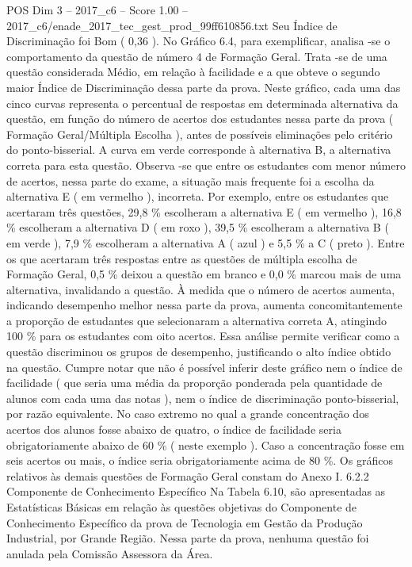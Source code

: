 \begin{textsample}{POS Dim 3 – 2017\_c6 – Score 1.00 – 2017\_c6/enade\_2017\_tec\_gest\_prod\_99ff610856.txt}
Seu Índice de Discriminação foi Bom ( 0,36 ).
No Gráfico 6.4, para exemplificar, analisa -se o comportamento da questão de número 4 de Formação Geral.
Trata -se de uma questão considerada Médio, em relação à facilidade e a que obteve o segundo maior Índice de Discriminação dessa parte da prova.
Neste gráfico, cada uma das cinco curvas representa o percentual de respostas em determinada alternativa da questão, em função do número de acertos dos estudantes nessa parte da prova ( Formação Geral/Múltipla Escolha ), antes de possíveis eliminações pelo critério do ponto-bisserial.
A curva em verde corresponde à alternativa B, a alternativa correta para esta questão.
Observa -se que entre os estudantes com menor número de acertos, nessa parte do exame, a situação mais frequente foi a escolha da alternativa E ( em vermelho ), incorreta.
Por exemplo, entre os estudantes que acertaram três questões, 29,8 \% escolheram a alternativa E ( em vermelho ), 16,8 \% escolheram a alternativa D ( em roxo ), 39,5 \% escolheram a alternativa B ( em verde ), 7,9 \% escolheram a alternativa A ( azul ) e 5,5 \% a C ( preto ).
Entre os que acertaram três respostas entre as questões de múltipla escolha de Formação Geral, 0,5 \% deixou a questão em branco e 0,0 \% marcou mais de uma alternativa, invalidando a questão.
À medida que o número de acertos aumenta, indicando desempenho melhor nessa parte da prova, aumenta concomitantemente a proporção de estudantes que selecionaram a alternativa correta A, atingindo 100 \% para os estudantes com oito acertos.
Essa análise permite verificar como a questão discriminou os grupos de desempenho, justificando o alto índice obtido na questão.
Cumpre notar que não é possível inferir deste gráfico nem o índice de facilidade ( que seria uma média da proporção ponderada pela quantidade de alunos com cada uma das notas ), nem o índice de discriminação ponto-bisserial, por razão equivalente.
No caso extremo no qual a grande concentração dos acertos dos alunos fosse abaixo de quatro, o índice de facilidade seria obrigatoriamente abaixo de 60 \% ( neste exemplo ).
Caso a concentração fosse em seis acertos ou mais, o índice seria obrigatoriamente acima de 80 \%.
Os gráficos relativos às demais questões de Formação Geral constam do Anexo I. 6.2.2 Componente de Conhecimento Específico Na Tabela 6.10, são apresentadas as Estatísticas Básicas em relação às questões objetivas do Componente de Conhecimento Específico da prova de Tecnologia em Gestão da Produção Industrial, por Grande Região.
Nessa parte da prova, nenhuma questão foi anulada pela Comissão Assessora da Área.

\end{textsample}
